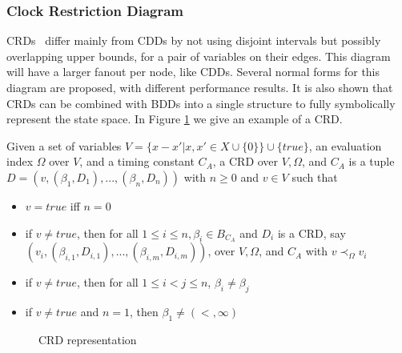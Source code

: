 \subsubsection{Clock Restriction Diagram}
CRDs~\cite{crds} differ mainly from CDDs by not using disjoint intervals but possibly overlapping upper bounds, for a pair of variables on their edges. This diagram will have a larger fanout per node, like CDDs. Several normal forms for this diagram are proposed, with different performance results. It is also shown that CRDs can be combined with BDDs into a single structure to fully symbolically represent the state space. In Figure \ref{fig:crd-example} we give an example of a CRD.
\begin{mydef}
Given a set of variables $V=\{x-x'|x,x'\in X \cup \{0\}\}\cup \{true\}$, an evaluation index $\Omega$ over $V$, and a timing constant $C_A$, a CRD over $V, \Omega$, and $C_A$ is a tuple $D = (v,(\beta_1,D_1),...,(\beta_n,D_n))$ with $n  \geq 0$ and $v \in V$ such that
\begin{itemize}
\item $v = true$ iff $n=0$
\item if $v \neq true$, then for all $1 \leq i \leq n, \beta_i \in B_{C_A}$ and $D_i$ is a CRD, say $(v_i,(\beta_{i,1},D_{i,1}),...,(\beta_{i,m},D_{i,m}))$, over $V, \Omega$, and $C_A$ with $v \prec_\Omega v_i$
\item if $v \neq true$, then for all $1 \leq i < j \leq n$, $\beta_i \neq \beta_j$
\item if $v \neq true$ and $n = 1$, then $\beta_1 \neq (<,\infty)$
\end{itemize}
\end{mydef}

\begin{figure}[h]
\begin{center}
\end{center}
\caption{CRD representation}
\label{fig:crd-example}
\end{figure}

